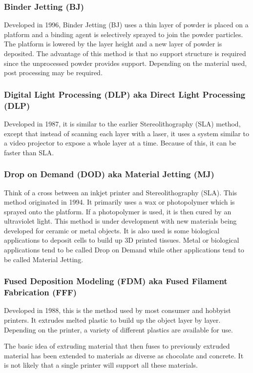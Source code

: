 \documentclass[english,10pt]{beamer}
\begin{document}
\begin{frame}
  \frametitle{Binder Jetting (BJ)}
  Developed in 1996, Binder Jetting (BJ) uses a thin layer of powder is placed on a platform and a binding agent is selectively sprayed to join the powder particles.  The platform is lowered by the layer height and a new layer of powder is deposited.  The advantage of this method is that no support structure is required since the unprocessed powder provides support.  Depending on the material used, post processing may be required.
\end{frame}

\begin{frame}
  \frametitle{Digital Light Processing (DLP) aka Direct Light Processing (DLP)}
  Developed in 1987, it is similar to the earlier Stereolithography (SLA) method, except that instead of scanning each layer with a laser, it uses a system similar to a video projector to expose a whole layer at a time.  Because of this, it can be faster than SLA.
\end{frame}

\begin{frame}
  \frametitle{Drop on Demand (DOD) aka Material Jetting (MJ)}
  Think of a cross between an inkjet printer and Stereolithography (SLA).  This method originated in 1994.  It primarily uses a wax or photopolymer which is sprayed onto the platform.  If a photopolymer is used, it is then cured by an ultraviolet light.  This method is under development with new materials being developed for ceramic or metal objects.  It is also used is some biological applications to deposit cells to build up 3D printed tissues.  Metal or biological applications tend to be called Drop on Demand while other applications tend to be called Material Jetting.
\end{frame}

\begin{frame}
  \frametitle{Fused Deposition Modeling (FDM) aka Fused Filament Fabrication (FFF)}
  Developed in 1988, this is the method used by most consumer and hobbyist printers.  It extrudes melted plastic to build up the object layer by layer.  Depending on the printer, a variety of different plastics are available for use.

  The basic idea of extruding material that then fuses to previously extruded material has been extended to materials as diverse as chocolate and concrete.  It is not likely that a single printer will support all these materials.
\end{frame}
\end{document}
